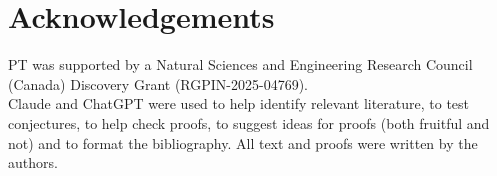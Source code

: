 \documentclass{article}
\theoremstyle{plain}
\theoremstyle{definition}
\begin{document}
 \section*{Acknowledgements}
 
PT was supported by a Natural Sciences and Engineering Research Council (Canada) Discovery Grant (RGPIN-2025-04769). \\
 
Claude and ChatGPT were used to help identify relevant literature, to test conjectures, to help check proofs, to suggest ideas for proofs (both fruitful and not) and to format the bibliography. All text and proofs were written by the authors.


	
	
	
	
 
\end{document}
